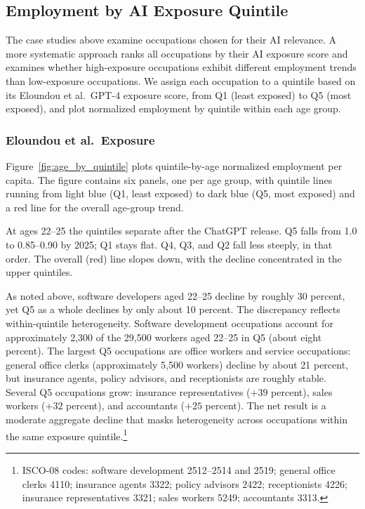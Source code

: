 \subsection{Employment by AI Exposure Quintile}\label{sec:results:quintiles}

The case studies above examine occupations chosen for their AI relevance. A more systematic approach ranks all occupations by their AI exposure score and examines whether high-exposure occupations exhibit different employment trends than low-exposure occupations. We assign each occupation to a quintile based on its Eloundou et al.\ GPT-4 exposure score, from Q1 (least exposed) to Q5 (most exposed), and plot normalized employment by quintile within each age group.

\subsubsection*{Eloundou et al.\ Exposure}

Figure~\ref{fig:age_by_quintile} plots quintile-by-age normalized employment per capita. The figure contains six panels, one per age group, with quintile lines running from light blue (Q1, least exposed) to dark blue (Q5, most exposed) and a red line for the overall age-group trend.

At ages 22--25 the quintiles separate after the ChatGPT release. Q5 falls from 1.0 to 0.85--0.90 by 2025; Q1 stays flat. Q4, Q3, and Q2 fall less steeply, in that order. The overall (red) line slopes down, with the decline concentrated in the upper quintiles.

As noted above, software developers aged 22--25 decline by roughly 30 percent, yet Q5 as a whole declines by only about 10 percent. The discrepancy reflects within-quintile heterogeneity. Software development occupations account for approximately 2,300 of the 29,500 workers aged 22--25 in Q5 (about eight percent). The largest Q5 occupations are office workers and service occupations: general office clerks (approximately 5,500 workers) decline by about 21 percent, but insurance agents, policy advisors, and receptionists are roughly stable. Several Q5 occupations grow: insurance representatives ($+39$ percent), sales workers ($+32$ percent), and accountants ($+25$ percent). The net result is a moderate aggregate decline that masks heterogeneity across occupations within the same exposure quintile.\footnote{ISCO-08 codes: software development 2512--2514 and 2519; general office clerks 4110; insurance agents 3322; policy advisors 2422; receptionists 4226; insurance representatives 3321; sales workers 5249; accountants 3313.}

